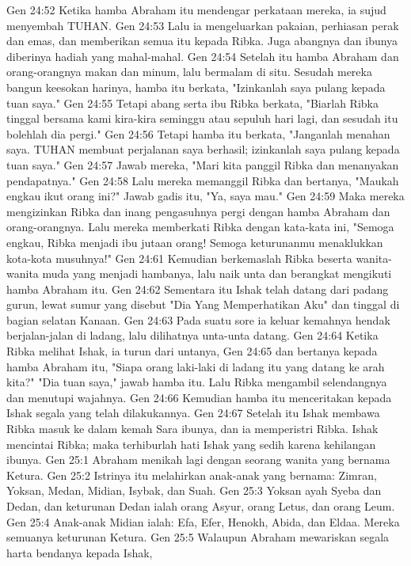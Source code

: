 Gen 24:52  Ketika hamba Abraham itu mendengar perkataan mereka, ia sujud menyembah TUHAN.
Gen 24:53  Lalu ia mengeluarkan pakaian, perhiasan perak dan emas, dan memberikan semua itu kepada Ribka. Juga abangnya dan ibunya diberinya hadiah yang mahal-mahal.
Gen 24:54  Setelah itu hamba Abraham dan orang-orangnya makan dan minum, lalu bermalam di situ. Sesudah mereka bangun keesokan harinya, hamba itu berkata, "Izinkanlah saya pulang kepada tuan saya."
Gen 24:55  Tetapi abang serta ibu Ribka berkata, "Biarlah Ribka tinggal bersama kami kira-kira seminggu atau sepuluh hari lagi, dan sesudah itu bolehlah dia pergi."
Gen 24:56  Tetapi hamba itu berkata, "Janganlah menahan saya. TUHAN membuat perjalanan saya berhasil; izinkanlah saya pulang kepada tuan saya."
Gen 24:57  Jawab mereka, "Mari kita panggil Ribka dan menanyakan pendapatnya."
Gen 24:58  Lalu mereka memanggil Ribka dan bertanya, "Maukah engkau ikut orang ini?" Jawab gadis itu, "Ya, saya mau."
Gen 24:59  Maka mereka mengizinkan Ribka dan inang pengasuhnya pergi dengan hamba Abraham dan orang-orangnya. Lalu mereka memberkati Ribka dengan kata-kata ini, "Semoga engkau, Ribka menjadi ibu jutaan orang! Semoga keturunanmu menaklukkan kota-kota musuhnya!"
Gen 24:61  Kemudian berkemaslah Ribka beserta wanita-wanita muda yang menjadi hambanya, lalu naik unta dan berangkat mengikuti hamba Abraham itu.
Gen 24:62  Sementara itu Ishak telah datang dari padang gurun, lewat sumur yang disebut "Dia Yang Memperhatikan Aku" dan tinggal di bagian selatan Kanaan.
Gen 24:63  Pada suatu sore ia keluar kemahnya hendak berjalan-jalan di ladang, lalu dilihatnya unta-unta datang.
Gen 24:64  Ketika Ribka melihat Ishak, ia turun dari untanya,
Gen 24:65  dan bertanya kepada hamba Abraham itu, "Siapa orang laki-laki di ladang itu yang datang ke arah kita?" "Dia tuan saya," jawab hamba itu. Lalu Ribka mengambil selendangnya dan menutupi wajahnya.
Gen 24:66  Kemudian hamba itu menceritakan kepada Ishak segala yang telah dilakukannya.
Gen 24:67  Setelah itu Ishak membawa Ribka masuk ke dalam kemah Sara ibunya, dan ia memperistri Ribka. Ishak mencintai Ribka; maka terhiburlah hati Ishak yang sedih karena kehilangan ibunya.
Gen 25:1  Abraham menikah lagi dengan seorang wanita yang bernama Ketura.
Gen 25:2  Istrinya itu melahirkan anak-anak yang bernama: Zimran, Yoksan, Medan, Midian, Isybak, dan Suah.
Gen 25:3  Yoksan ayah Syeba dan Dedan, dan keturunan Dedan ialah orang Asyur, orang Letus, dan orang Leum.
Gen 25:4  Anak-anak Midian ialah: Efa, Efer, Henokh, Abida, dan Eldaa. Mereka semuanya keturunan Ketura.
Gen 25:5  Walaupun Abraham mewariskan segala harta bendanya kepada Ishak,
